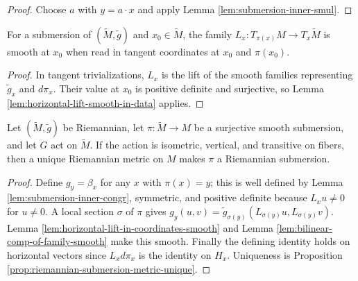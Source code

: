 \begin{proof}
\leanok
{}
\sketch Choose $a$ with $y=a\cdot x$ and apply Lemma \ref{lem:submersion-inner-smul}.
\end{proof}

\begin{lemma}
\label{lem:horizontal-lift-in-coordinates-smooth}
\leanok
{}
For a submersion of $(\tilde M,\tilde g)$ and $x_0\in\tilde M$, the family $L_x:T_{\pi(x)}M\to T_x\tilde M$ is smooth at $x_0$ when read in tangent coordinates at $x_0$ and $\pi(x_0)$.
\end{lemma}

\begin{proof}
\leanok
{}
\sketch In tangent trivializations, $L_x$ is the lift of the smooth families representing $\tilde g_x$ and $d\pi_x$. Their value at $x_0$ is positive definite and surjective, so Lemma \ref{lem:horizontal-lift-smooth-in-data} applies.
\end{proof}

\begin{theorem}
\label{thm:group-action-riemannian-submersion}
\leanok
{}
Let $(\tilde M,\tilde g)$ be Riemannian, let $\pi:\tilde M\to M$ be a surjective smooth submersion, and let $G$ act on $\tilde M$. If the action is isometric, vertical, and transitive on fibers, then a unique Riemannian metric on $M$ makes $\pi$ a Riemannian submersion.
\end{theorem}

\begin{proof}
\leanok
{}
\sketch Define $g_y=\beta_x$ for any $x$ with $\pi(x)=y$; this is well defined by Lemma \ref{lem:submersion-inner-congr}, symmetric, and positive definite because $L_xu\ne0$ for $u\ne0$. A local section $\sigma$ of $\pi$ gives $g_y(u,v)=\tilde g_{\sigma(y)}(L_{\sigma(y)}u,L_{\sigma(y)}v)$. Lemma \ref{lem:horizontal-lift-in-coordinates-smooth} and Lemma \ref{lem:bilinear-comp-of-family-smooth} make this smooth. Finally the defining identity holds on horizontal vectors since $L_xd\pi_x$ is the identity on $H_x$. Uniqueness is Proposition \ref{prop:riemannian-submersion-metric-unique}.
\end{proof}

